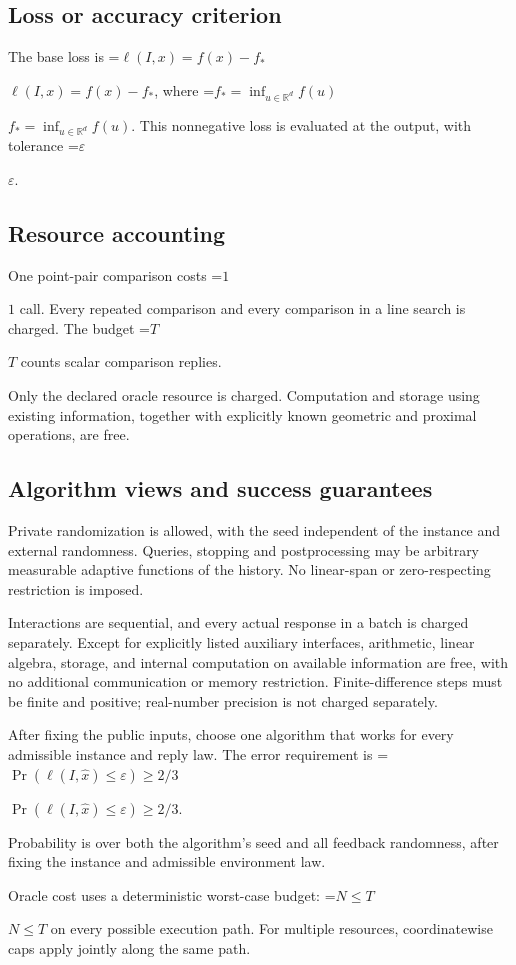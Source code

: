 \documentclass[10pt,a4paper]{article}
\newcommand{\AtlasMath}[1]{\par\begingroup\centering\setbox0=\hbox{$\displaystyle #1$}\ifdim\wd0>1.4\linewidth\typeout{ATLAS WIDE FORMULA: \the\wd0}\fi\ifdim\wd0>\linewidth\resizebox{\linewidth}{!}{\box0}\else\box0\fi\par\endgroup}
\newcommand{\AtlasInlineMath}[1]{\begingroup\setbox0=\hbox{$#1$}\ifdim\wd0>.4\linewidth\endgroup\AtlasMath{#1}\else\endgroup$#1$\fi}
\begin{document}
\subsection{Loss or accuracy criterion}
The base loss is \AtlasInlineMath{\ell(I,x)=f(x)-f_*}, where \AtlasInlineMath{f_*=\inf_{u\in \mathbb{R}^d}f(u)}. This nonnegative loss is evaluated at the output, with tolerance \AtlasInlineMath{\varepsilon}.

\subsection{Resource accounting}
One point-pair comparison costs \AtlasInlineMath{1} call. Every repeated comparison and every comparison in a line search is charged. The budget \AtlasInlineMath{T} counts scalar comparison replies.

Only the declared oracle resource is charged. Computation and storage using existing information, together with explicitly known geometric and proximal operations, are free.

\subsection{Algorithm views and success guarantees}
Private randomization is allowed, with the seed independent of the instance and external randomness. Queries, stopping and postprocessing may be arbitrary measurable adaptive functions of the history. No linear-span or zero-respecting restriction is imposed.

Interactions are sequential, and every actual response in a batch is charged separately. Except for explicitly listed auxiliary interfaces, arithmetic, linear algebra, storage, and internal computation on available information are free, with no additional communication or memory restriction. Finite-difference steps must be finite and positive; real-number precision is not charged separately.

After fixing the public inputs, choose one algorithm that works for every admissible instance and reply law. The error requirement is \AtlasInlineMath{\Pr(\ell(I,\widehat{x})\le \varepsilon)\ge2/3}.

Probability is over both the algorithm's seed and all feedback randomness, after fixing the instance and admissible environment law.

Oracle cost uses a deterministic worst-case budget: \AtlasInlineMath{N\le T} on every possible execution path. For multiple resources, coordinatewise caps apply jointly along the same path.
\end{document}
